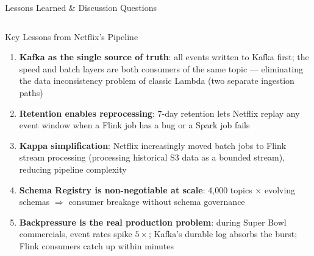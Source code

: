 \documentclass[aspectratio=169,10pt]{beamer}
\begin{document}
\begin{frame}{Lessons Learned \& Discussion Questions}
  \begin{columns}[T]
      \begin{block}{Key Lessons from Netflix's Pipeline}
        \begin{enumerate}
          \item \textbf{Kafka as the single source of truth}:
                all events written to Kafka first; the speed and
                batch layers are both consumers of the same topic —
                eliminating the data inconsistency problem of classic
                Lambda (two separate ingestion paths)
          \item \textbf{Retention enables reprocessing}:
                7-day retention lets Netflix replay any event window
                when a Flink job has a bug or a Spark job fails
          \item \textbf{Kappa simplification}: Netflix increasingly
                moved batch jobs to Flink stream processing
                (processing historical S3 data as a bounded stream),
                reducing pipeline complexity
          \item \textbf{Schema Registry is non-negotiable at scale}:
                4{,}000 topics $\times$ evolving schemas $\Rightarrow$
                consumer breakage without schema governance
          \item \textbf{Backpressure is the real production problem}:
                during Super Bowl commercials, event rates spike
                $5\times$; Kafka's durable log absorbs the burst;
                Flink consumers catch up within minutes
        \end{enumerate}
      \end{block}


\end{columns}
\end{frame}
\end{document}
